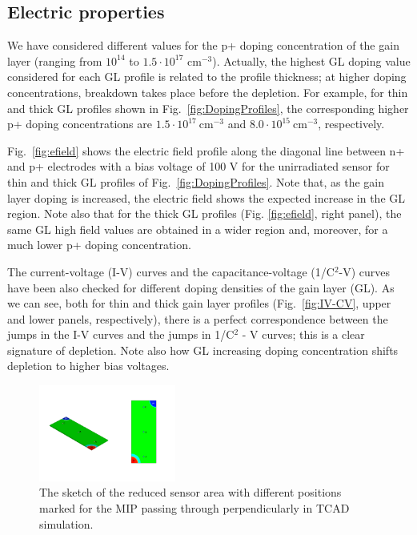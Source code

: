\documentclass[aps,pt14,superscriptaddress,showpacs,floatfix,nofootinbib]{revtex4}
\begin{document}
\subsection{Electric properties}    
We have considered different values for the p+ doping concentration of the gain layer (ranging from $10^{14}$ to $1.5\cdot 10^{17}$ cm$^{-3}$). Actually, the highest GL doping value considered for each GL profile is related to the profile thickness; at higher doping concentrations, breakdown takes place before the depletion. For example, for thin and thick GL profiles shown in Fig.~\ref{fig:DopingProfiles}, the corresponding higher p+ doping  concentrations are $1.5\cdot 10^{17}\ \mathrm{cm^{-3}}$ and $8.0\cdot 10^{15}\ \mathrm{cm^{-3}}$, respectively. 

Fig.~\ref{fig:efield} shows the electric field profile along the diagonal line between n+ and p+ electrodes with a bias voltage of 100 V for the unirradiated sensor for thin and thick GL profiles of Fig.~\ref{fig:DopingProfiles}. Note that, as the gain layer doping is increased, the electric field shows the expected increase in the GL region. Note also that for the thick GL profiles (Fig. \ref{fig:efield}, right panel), the same GL high field values are obtained in a wider region and, moreover, for a much lower p+ doping concentration. 



The current-voltage (I-V) curves and the capacitance-voltage (1/C$^2$-V) curves have been also checked for 
different doping densities of the gain layer (GL). As we can see, both for thin and thick gain layer profiles (Fig.~\ref{fig:IV-CV}, upper and lower panels, respectively), there is a perfect correspondence between the jumps in the I-V curves and the jumps in 1/C$^2$ - V curves; this is a clear signature of depletion. Note also how GL increasing doping concentration shifts depletion to higher bias voltages.   

\begin{figure}[hbtp]
\begin{center}
\includegraphics[width=0.4\textwidth,keepaspectratio]{figures1/Slice.pdf}
\caption{The sketch of the reduced sensor area with different positions marked for the MIP passing through perpendicularly in TCAD simulation.\label{fig:box_points}}
\end{center}
\end{figure}
\end{document}
